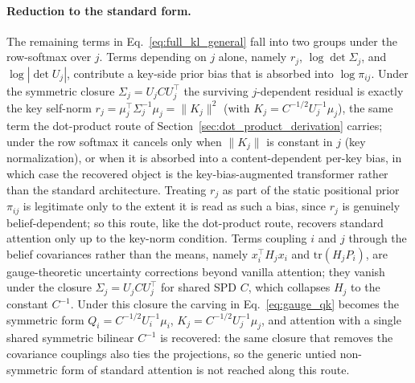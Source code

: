 \paragraph{Reduction to the standard form.}
The remaining terms in Eq.~\eqref{eq:full_kl_general} fall into two groups under the row-softmax over $j$. Terms depending on $j$ alone, namely $r_j$, $\log\det\Sigma_j$, and $\log|\det U_j|$, contribute a key-side prior bias that is absorbed into $\log\pi_{ij}$. Under the symmetric closure $\Sigma_j = U_j C U_j^\top$ the surviving $j$-dependent residual is exactly the key self-norm $r_j = \mu_j^\top\Sigma_j^{-1}\mu_j = \|K_j\|^2$ (with $K_j = C^{-1/2}U_j^{-1}\mu_j$), the same term the dot-product route of Section~\ref{sec:dot_product_derivation} carries; under the row softmax it cancels only when $\|K_j\|$ is constant in $j$ (key normalization), or when it is absorbed into a content-dependent per-key bias, in which case the recovered object is the key-bias-augmented transformer rather than the standard architecture. Treating $r_j$ as part of the static positional prior $\pi_{ij}$ is legitimate only to the extent it is read as such a bias, since $r_j$ is genuinely belief-dependent; so this route, like the dot-product route, recovers standard attention only up to the key-norm condition. Terms coupling $i$ and $j$ through the belief covariances rather than the means, namely $x_i^\top H_j x_i$ and $\mathrm{tr}(H_j P_i)$, are gauge-theoretic uncertainty corrections beyond vanilla attention; they vanish under the closure $\Sigma_j = U_j C U_j^\top$ for shared SPD $C$, which collapses $H_j$ to the constant $C^{-1}$. Under this closure the carving in Eq.~\eqref{eq:gauge_qk} becomes the symmetric form $Q_i = C^{-1/2}U_i^{-1}\mu_i$, $K_j = C^{-1/2}U_j^{-1}\mu_j$, and attention with a single shared symmetric bilinear $C^{-1}$ is recovered: the same closure that removes the covariance couplings also ties the projections, so the generic untied non-symmetric form of standard attention is not reached along this route.

